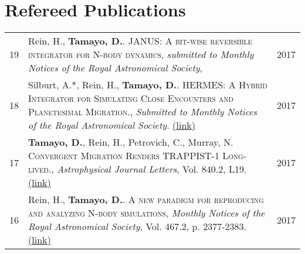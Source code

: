 \documentclass[10pt]{article} %
\begin{document}
{%




\section{Refereed Publications}

\begin{tabular}{>{\hfill}r|p{14.3cm}l}
19 & Rein, H., {\bf Tamayo, D.}. \textsc{JANUS: A bit-wise reversible integrator for N-body dynamics}, {\it submitted to Monthly Notices of the Royal Astronomical Society}, & 2017 \\

18 & Silburt, A.*, Rein, H., {\bf Tamayo, D.}. \textsc{HERMES: A Hybrid Integrator for Simulating Close Encounters and Planetesimal Migration.}, {\it Submitted to Monthly Notices of the Royal Astronomical Society.} \href{http://cita.utoronto.ca/~dtamayo/hermes.pdf}{(link)} & 2017 \\

17 & {\bf Tamayo, D.}, Rein, H., Petrovich, C., Murray, N. \textsc{Convergent Migration Renders TRAPPIST-1 Long-lived.}, {\it Astrophysical Journal Letters}, Vol. 840.2, L19. \href{https://arxiv.org/abs/1704.02957}{(link)} & 2017 \\

16 & Rein, H., {\bf Tamayo, D.}. \textsc{A new paradigm for reproducing and analyzing N-body simulations}, {\it Monthly Notices of the Royal Astronomical Society}, Vol. 467.2, p. 2377-2383. \href{https://arxiv.org/abs/1701.07423}{(link)} & 2017 \\


\end{tabular}}
\end{document}

